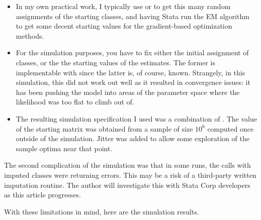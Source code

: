 \begin{itemize}
  \item In my own practical work, I typically use 
     or 
    to get this many random assignments of the starting classes,
    and having Stata run the EM algorithm to get some decent 
    starting values for the gradient-based optimization methods.
  \item For the simulation purposes, you have to fix either 
    the initial assignment of classes, or the the starting values 
    of the estimates. The former is implementable with 
     since 
    the latter is, of course, known. Strangely, in this simulation,
    this did not work out well as it resulted in convergence issues:
    it has been pushing the model into areas of the parameter space
    where the likelihood was too flat to climb out of.
  \item The resulting simulation specification I used was a combination
    of . 
    The value of the starting matrix  was obtained
    from a sample of size $10^6$ computed once outside of the simulation.
    Jitter was added to allow some exploration of the sample optima 
    near that point.
\end{itemize}

The second complication of the simulation was that in some runs,
the  calls with imputed classes were returning 
errors. This may be a risk of a third-party written imputation routine.
The author will investigate this with Stata Corp developers as this
article progresses.

\begin{stlog}
  \nullskip
\end{stlog}
  
  

With these limitations in mind, here are the simulation results.

\begin{stlog} 
  \nullskip
\end{stlog}

\begin{stlog} 
  \nullskip
\end{stlog}

\begin{stlog} 
  \nullskip
\end{stlog}

